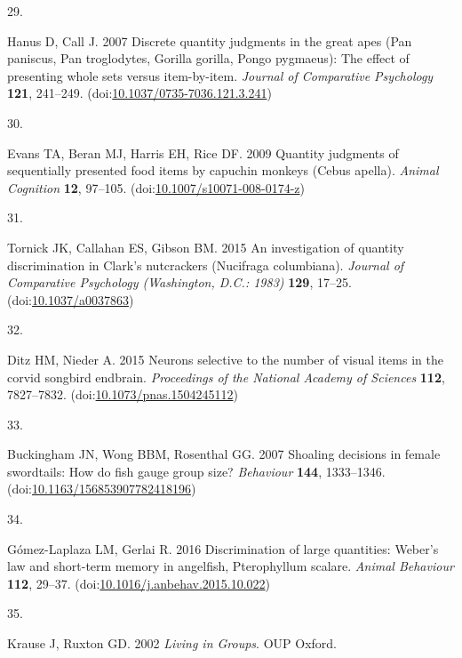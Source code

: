 \documentclass[
  ,doc,floatsintext]{apa6}
\newlength{\cslhangindent}
\newlength{\csllabelwidth}
\newlength{\cslentryspacingunit} %
\newenvironment{CSLReferences}[2] %
 {%
  \setlength{\parindent}{0pt}
  \ifodd #1
  \let\oldpar\par
  \def\par{\hangindent=\cslhangindent\oldpar}
  \fi
  \setlength{\parskip}{#2\cslentryspacingunit}
 }%
 {}
\newcommand{\CSLLeftMargin}[1]{\parbox[t]{\csllabelwidth}{#1}}
\newcommand{\CSLRightInline}[1]{\parbox[t]{\linewidth - \csllabelwidth}{#1}\break}
\begin{document}
\begin{CSLReferences}{0}{0}
\leavevmode{}%
\CSLLeftMargin{29. }
\CSLRightInline{Hanus D, Call J. 2007 Discrete quantity judgments in the great apes ({Pan} paniscus, {Pan} troglodytes, {Gorilla} gorilla, {Pongo} pygmaeus): {The} effect of presenting whole sets versus item-by-item. \emph{Journal of Comparative Psychology} \textbf{121}, 241--249. (doi:\href{https://doi.org/10.1037/0735-7036.121.3.241}{10.1037/0735-7036.121.3.241})}

\leavevmode{}%
\CSLLeftMargin{30. }
\CSLRightInline{Evans TA, Beran MJ, Harris EH, Rice DF. 2009 Quantity judgments of sequentially presented food items by capuchin monkeys ({Cebus} apella). \emph{Animal Cognition} \textbf{12}, 97--105. (doi:\href{https://doi.org/10.1007/s10071-008-0174-z}{10.1007/s10071-008-0174-z})}

\leavevmode{}%
\CSLLeftMargin{31. }
\CSLRightInline{Tornick JK, Callahan ES, Gibson BM. 2015 An investigation of quantity discrimination in {Clark}'s nutcrackers ({Nucifraga} columbiana). \emph{Journal of Comparative Psychology (Washington, D.C.: 1983)} \textbf{129}, 17--25. (doi:\href{https://doi.org/10.1037/a0037863}{10.1037/a0037863})}

\leavevmode{}%
\CSLLeftMargin{32. }
\CSLRightInline{Ditz HM, Nieder A. 2015 Neurons selective to the number of visual items in the corvid songbird endbrain. \emph{Proceedings of the National Academy of Sciences} \textbf{112}, 7827--7832. (doi:\href{https://doi.org/10.1073/pnas.1504245112}{10.1073/pnas.1504245112})}

\leavevmode{}%
\CSLLeftMargin{33. }
\CSLRightInline{Buckingham JN, Wong BBM, Rosenthal GG. 2007 Shoaling decisions in female swordtails: {How} do fish gauge group size? \emph{Behaviour} \textbf{144}, 1333--1346. (doi:\href{https://doi.org/10.1163/156853907782418196}{10.1163/156853907782418196})}

\leavevmode{}%
\CSLLeftMargin{34. }
\CSLRightInline{Gómez-Laplaza LM, Gerlai R. 2016 Discrimination of large quantities: {Weber}'s law and short-term memory in angelfish, {Pterophyllum} scalare. \emph{Animal Behaviour} \textbf{112}, 29--37. (doi:\href{https://doi.org/10.1016/j.anbehav.2015.10.022}{10.1016/j.anbehav.2015.10.022})}

\leavevmode{}%
\CSLLeftMargin{35. }
\CSLRightInline{Krause J, Ruxton GD. 2002 \emph{Living in {Groups}}. OUP Oxford. }


\end{CSLReferences}
\end{document}
